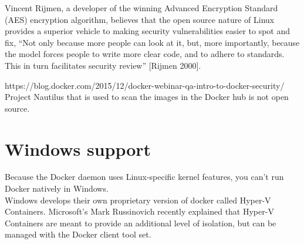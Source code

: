 Vincent Rijmen, a developer of the winning Advanced Encryption Standard (AES) encryption algorithm, believes that the open source nature of Linux provides a superior vehicle to making security vulnerabilities easier to spot and fix, “Not only because more people can look at it, but, more importantly, because the model forces people to write more clear code, and to adhere to standards. This in turn facilitates security review” [Rijmen 2000].

https://blog.docker.com/2015/12/docker-webinar-qa-intro-to-docker-security/
Project Nautilus that is used to scan the images in the Docker hub is not open source.

\section{Windows support}
Because the Docker daemon uses Linux-specific kernel features, you can’t run Docker natively in Windows. \\

Windows develops their own proprietary version of docker called Hyper-V Containers.
Microsoft's Mark Russinovich recently explained that Hyper-V Containers are meant to provide an additional level of isolation, but can be managed with the Docker client tool set.



